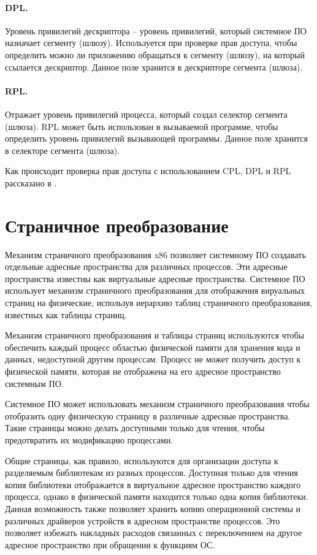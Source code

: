 \paragraph{DPL.} Уровень привилегий дескриптора -- уровень привилегий, который системное ПО назначает сегменту (шлюзу).
Используется при проверке прав доступа, чтобы определить можно ли приложению обращаться к сегменту (шлюзу), на который
ссылается дескриптор. Данное поле хранится в дескрипторе сегмента (шлюза).

\paragraph{RPL.} Отражает уровень привилегий процесса, который создал селектор сегмента (шлюза). RPL может быть использован
в вызываемой программе, чтобы определить уровень привилегий вызывающей программы. Данное поле хранится
в селекторе сегмента (шлюза).

Как происходит проверка прав доступа с использованием CPL, DPL и RPL рассказано в \cite{amd_pm_v2}.

\section{Страничное преобразование}
Механизм страничного преобразования x86 позволяет системному ПО создавать отдельные адресные
пространства для различных процессов. Эти адресные пространства известны как
виртуальные адресные пространства. Системное ПО использует механизм страничного преобразования
для отображения вируальных страниц на физические, используя иерархию таблиц страничного преобразования,
известных как таблицы страниц.

Механизм страничного преобразования и таблицы страниц используются чтобы обеспечить
каждый процесс областью физической памяти для хранения кода и данных, недоступной другим процессам.
Процесс не может получить доступ к физической памяти, которая не отображена на его адресное
пространство системным ПО.

Системное ПО может использовать механизм страничного преобразования чтобы отобразить одну физическую
страницу в различные адресные пространства. Такие страницы можно делать доступными только для чтения,
чтобы предотвратить их модификацию процессами.

Общие страницы, как правило, используются для организации доступа к разделяемым библиотекам из
разных процессов. Доступная только для чтения копия библиотеки отображается в виртуальное адресное
пространство каждого процесса, однако в физической памяти находится только одна копия библиотеки.
Данная возможность также позволяет хранить копию операционной системы и различных драйверов устройств
в адресном пространстве процессов. Это позволяет избежать накладных расходов связанных с переключением
на другое адресное пространство при обращении к функциям ОС.

